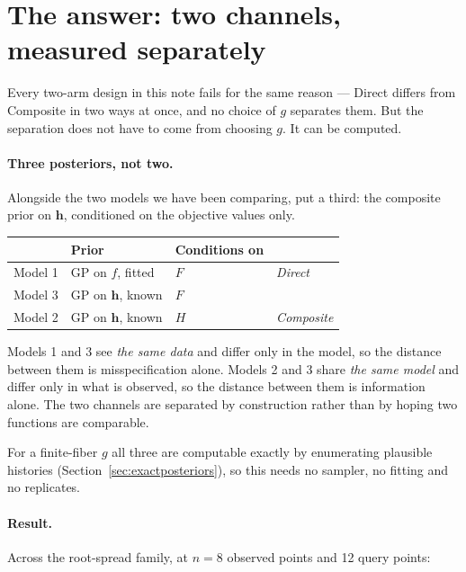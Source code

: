 \section{The answer: two channels, measured separately}
\label{sec:channels}

Every two-arm design in this note fails for the same reason --- Direct differs
from Composite in two ways at once, and no choice of $g$ separates them. But
the separation does not have to come from choosing $g$. It can be computed.

\paragraph{Three posteriors, not two.} Alongside the two models we have been
comparing, put a third: the composite prior on $\mathbf h$, conditioned on the
objective values only.

\begin{center}
\begin{tabular}{llll}
\toprule
 & Prior & Conditions on & \\
\midrule
Model 1 & GP on $f$, fitted & $F$ & \emph{Direct} \\
Model 3 & GP on $\mathbf h$, known & $F$ & \\
Model 2 & GP on $\mathbf h$, known & $H$ & \emph{Composite} \\
\bottomrule
\end{tabular}
\end{center}

\noindent Models 1 and 3 see \emph{the same data} and differ only in the
model, so the distance between them is misspecification alone. Models 2 and 3
share \emph{the same model} and differ only in what is observed, so the
distance between them is information alone. The two channels are separated by
construction rather than by hoping two functions are comparable.

For a finite-fiber $g$ all three are computable exactly by enumerating
plausible histories (Section~\ref{sec:exactposteriors}), so this needs no sampler, no
fitting and no replicates.

\paragraph{Result.} Across the root-spread family, at $n=8$ observed points and
12 query points:

